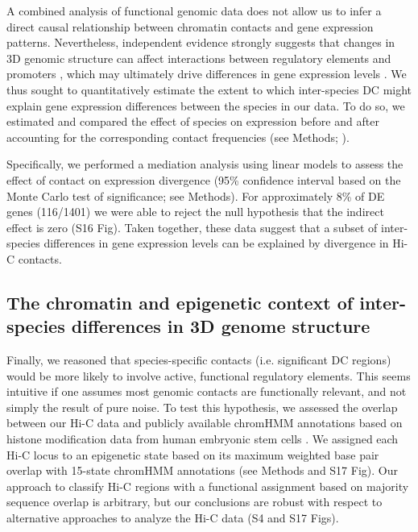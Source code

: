 A combined analysis of functional genomic data does not allow us to infer a direct causal relationship between chromatin contacts and gene expression patterns. Nevertheless, independent evidence strongly suggests that changes in 3D genomic structure can affect interactions between regulatory elements and promoters \cite{Rao.2014, Dily.2014, Chen.2017, Kagey.2010, Lupianez.2015}, which may ultimately drive differences in gene expression levels \cite{Rao.2017, Dily.2014, Chen.2017, Kagey.2010, Lupianez.2015, Siersbaek.2017, Niskanen.2018}. We thus sought to quantitatively estimate the extent to which inter-species DC might explain gene expression differences between the species in our data. To do so, we estimated and compared the effect of species on expression before and after accounting for the corresponding contact frequencies (see Methods; \cite{Baron.1986}).

Specifically, we performed a mediation analysis using linear models to assess the effect of contact on expression divergence (95\% confidence interval based on the Monte Carlo test of significance; see Methods). For approximately 8\% of DE genes (116/1401) we were able to reject the null hypothesis that the indirect effect is zero (S16 Fig). Taken together, these data suggest that a subset of inter-species differences in gene expression levels can be explained by divergence in Hi-C contacts.

\subsection{The chromatin and epigenetic context of inter-species differences in 3D genome structure}

Finally, we reasoned that species-specific contacts (i.e. significant DC regions) would be more likely to involve active, functional regulatory elements. This seems intuitive if one assumes most genomic contacts are functionally relevant, and not simply the result of pure noise. To test this hypothesis, we assessed the overlap between our Hi-C data and publicly available chromHMM annotations based on histone modification data from human embryonic stem cells \cite{consortium.2012a}. We assigned each Hi-C locus to an epigenetic state based on its maximum weighted base pair overlap with 15-state chromHMM annotations (see Methods and S17 Fig). Our approach to classify Hi-C regions with a functional assignment based on majority sequence overlap is arbitrary, but our conclusions are robust with respect to alternative approaches to analyze the Hi-C data (S4 and S17 Figs).

